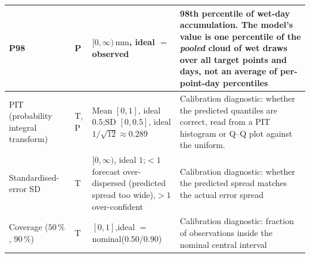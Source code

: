 {\begin{longtable}{|>{\raggedright\arraybackslash}p{3.1cm}|>{\raggedright\arraybackslash}p{0.6cm}|>{\raggedright\arraybackslash}p{3.3cm}|>{\raggedright\arraybackslash}p{6.3cm}|}
        \hline
        P98 & P & $[0,\infty)\,\mathrm{mm}$, ideal $=$ observed & 98th percentile of wet-day accumulation. The model's value is one percentile of the \emph{pooled} cloud of wet draws over all target points and days, not an average of per-point-day percentiles \\
        \hline
        PIT (probability integral transform) & T, P& Mean $[0,1]$, ideal $0.5$;\newline SD $[0,0.5]$, ideal $1/\sqrt{12}\approx0.289$ & Calibration diagnostic: whether the predicted quantiles are correct, read from a PIT histogram or Q--Q plot against the uniform. \\
        \hline
        Standardised-error SD & T & $[0,\infty)$, ideal $1$;\newline $<1$ forecast over-dispersed (predicted spread too wide),\newline $>1$ over-confident & Calibration diagnostic: whether the predicted spread matches the actual error spread \\
        \hline
        Coverage ($50\,\%$, $90\,\%$) & T & $[0,1]$,\newline ideal $=$ nominal\newline ($0.50$/$0.90$) & Calibration diagnostic: fraction of observations inside the nominal central interval \\
        \hline
\end{longtable}
}

